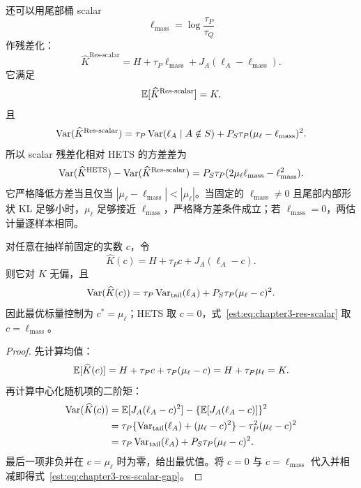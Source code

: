 还可以用尾部桶 scalar
\begin{equation*}
 \ell_{\mathrm{mass}}=\log\frac{\tau_P}{\tau_Q}
\end{equation*}
作残差化：
\begin{equation}
 \widehat K^{\mathrm{Res\text{-}scalar}}
 =H+\tau_P\ell_{\mathrm{mass}}+J_A(\ell_A-\ell_{\mathrm{mass}}).
 \label{est:eq:chapter3-res-scalar}
\end{equation}
它满足
\begin{equation*}
 \mathbb E[\widehat K^{\mathrm{Res\text{-}scalar}}]=K,
\end{equation*}
且
\begin{equation}
 \operatorname{Var}(\widehat K^{\mathrm{Res\text{-}scalar}})
 =\tau_P\operatorname{Var}(\ell_A\mid A\notin S)+P_S\tau_P(\mu_\ell-\ell_{\mathrm{mass}})^2.
 \label{est:eq:chapter3-res-scalar-var}
\end{equation}
所以 scalar 残差化相对 HETS 的方差差为
\begin{equation}
 \operatorname{Var}(\widehat K^{\mathrm{HETS}})-\operatorname{Var}(\widehat K^{\mathrm{Res\text{-}scalar}})
 =P_S\tau_P(2\mu_\ell\ell_{\mathrm{mass}}-\ell_{\mathrm{mass}}^2).
 \label{est:eq:chapter3-res-scalar-gap}
\end{equation}
它严格降低方差当且仅当 $|\mu_\ell-\ell_{\mathrm{mass}}|<|\mu_\ell|$。当固定的 $\ell_{\mathrm{mass}}\ne0$ 且尾部内部形状 KL 足够小时，$\mu_\ell$ 足够接近 $\ell_{\mathrm{mass}}$，严格降方差条件成立；若 $\ell_{\mathrm{mass}}=0$，两估计量逐样本相同。

\begin{proposition}[标量尾部控制族]
对任意在抽样前固定的实数 $c$，令
\begin{equation*}
 \widehat K(c)=H+\tau_Pc+J_A(\ell_A-c).
\end{equation*}
则它对 $K$ 无偏，且
\begin{equation*}
 \operatorname{Var}(\widehat K(c))
 =\tau_P\operatorname{Var}_{\mathrm{tail}}(\ell_A)+P_S\tau_P(\mu_\ell-c)^2.
\end{equation*}
因此最优标量控制为 $c^*=\mu_\ell$；HETS 取 $c=0$，式~\eqref{est:eq:chapter3-res-scalar} 取 $c=\ell_{\mathrm{mass}}$。
\end{proposition}

\begin{proof}
先计算均值：
\begin{equation*}
 \mathbb E[\widehat K(c)]=H+\tau_Pc+\tau_P(\mu_\ell-c)=H+\tau_P\mu_\ell=K.
\end{equation*}
再计算中心化随机项的二阶矩：
\begin{align*}
 \operatorname{Var}(\widehat K(c))
 &=\mathbb E[J_A(\ell_A-c)^2]-\{\mathbb E[J_A(\ell_A-c)]\}^2\\
 &=\tau_P\{\operatorname{Var}_{\mathrm{tail}}(\ell_A)+(\mu_\ell-c)^2\}
   -\tau_P^2(\mu_\ell-c)^2\\
 &=\tau_P\operatorname{Var}_{\mathrm{tail}}(\ell_A)+P_S\tau_P(\mu_\ell-c)^2.
\end{align*}
最后一项非负并在 $c=\mu_\ell$ 时为零，给出最优值。将 $c=0$ 与 $c=\ell_{\mathrm{mass}}$ 代入并相减即得式~\eqref{est:eq:chapter3-res-scalar-gap}。
\end{proof}

